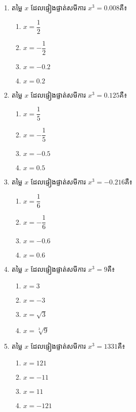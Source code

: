 \begin{enumerate}
\item តម្លៃ $x$ ដែលផ្ទៀងផ្ទាត់សមីការ $x^3=0.008$គឺ៖
\begin{multicols}{4}
\begin{enumerate}[label=\alph*.]
	\item $x=\dfrac{1}{2}$
	\item $x=-\dfrac{1}{2}$
	\item $x=-0.2$
	\item $x=0.2$
\end{enumerate}
\end{multicols}
\item តម្លៃ $x$ ដែលផ្ទៀងផ្ទាត់សមីការ $x^3=0.125$គឺ៖
\begin{multicols}{4}
\begin{enumerate}[label=\alph*.]
	\item $x=\dfrac{1}{5}$
	\item $x=-\dfrac{1}{5}$
	\item $x=-0.5$
	\item $x=0.5$
\end{enumerate}
\end{multicols}

\item តម្លៃ $x$ ដែលផ្ទៀងផ្ទាត់សមីការ $x^3=-0.216$គឺ៖
\begin{multicols}{4}
\begin{enumerate}[label=\alph*.]
	\item $x=\dfrac{1}{6}$
	\item $x=-\dfrac{1}{6}$
	\item $x=-0.6$
	\item $x=0.6$
\end{enumerate}
\end{multicols}

\item តម្លៃ $x$ ដែលផ្ទៀងផ្ទាត់សមីការ $x^3=9$គឺ៖
\begin{multicols}{4}
\begin{enumerate}[label=\alph*.]
	\item $x=3$
	\item $x=-3$
	\item $x=\sqrt{3}$
	\item $x=\sqrt[3]{9}$
\end{enumerate}
\end{multicols}

\item តម្លៃ $x$ ដែលផ្ទៀងផ្ទាត់សមីការ $x^3=1331$គឺ៖
\begin{multicols}{4}
\begin{enumerate}[label=\alph*.]
	\item $x=121$
	\item $x=-11$
	\item $x=11$
	\item $x=-121$
\end{enumerate}
\end{multicols}


\end{enumerate}
